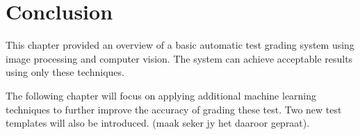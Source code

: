 \section{Conclusion}

This chapter provided an overview of a basic automatic test grading system using image processing and computer vision. The system can achieve acceptable results using only these techniques.

The following chapter will focus on applying additional machine learning techniques to further improve the accuracy of grading these test. Two new test templates will also be introduced. (maak seker jy het daaroor gepraat).